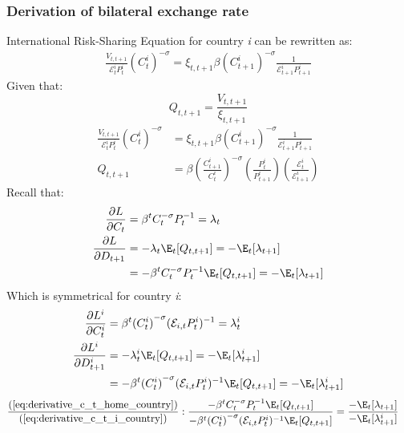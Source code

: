 \subsubsection{Derivation of bilateral exchange rate}
International Risk-Sharing Equation for country \textit{i} can be rewritten as:
\begin{align}
    \frac{V_{t,t+1}}{\mathcal{E}^i_tP^i_t}({C^{i}_{t}})^{-\sigma} = \xi_{t,t+1} \beta ({C^{i}_{t+1}})^{-\sigma} \frac{1}{\mathcal{E}^i_{t+1}P^{i}_{t+1}} \label{eq:appendix_bilateral_start}
\end{align}
Given that:
\begin{equation}
    Q_{t,t+1} = \frac{V_{t,t+1}}{\xi_{t,t+1}}
\end{equation}
\begin{align}
    \frac{V_{t,t+1}}{\mathcal{E}^i_tP^i_t}({C^{i}_{t}})^{-\sigma}         & = \xi_{t,t+1} \beta ({C^{i}_{t+1}})^{-\sigma} \frac{1}{\mathcal{E}^i_{t+1}P^{i}_{t+1}}                                                                    \\
    Q_{t,t+1}                                                             & = \beta \left(\frac{C^i_{t+1}}{C^i_{t}}\right)^{-\sigma} \left(\frac{P^i_t}{P^i_{t+1}}\right) \left(\frac{\mathcal{E}^i_{t}}{\mathcal{E}^i_{t+1}} \right) 
\end{align}
Recall that:
\begin{align}
    \frac{\partial L}{\partial C_t} &= \beta^t C_t^{-\sigma} P_{t}^{-1} = \lambda_t \\
    \frac{\partial L}{\partial D_{t+1}} & = -\lambda_t \E_t[Q_{t,t+1}] = -\E_t[\lambda_{t+1}] \\
    &=-\beta^t C_t^{-\sigma} P_{t}^{-1} \E_t[Q_{t,t+1}] = -\E_t[\lambda_{t+1}] \label{eq:derivative_c_t_home_country}
\end{align}
Which is symmetrical for country \textit{i}:
\begin{align}
    \frac{\partial L^i}{\partial C_t^i} &= \beta^t {(C^i_t)}^{-\sigma} (\mathcal{E}_{i,t}P^i_{t})^{-1} = \lambda^i_t \\
    \frac{\partial L^i}{\partial D_{t+1}^i} & = -\lambda^i_t \E_t[Q_{t,t+1}] = -\E_t[\lambda^i_{t+1}] \\
    &=-\beta^t {(C^i_t)}^{-\sigma} (\mathcal{E}_{i,t}P^i_{t})^{-1} \E_t[Q_{t,t+1}] = -\E_t[\lambda^i_{t+1}] \label{eq:derivative_c_t_i_country}
\end{align}
\begin{align}
    \frac{\text{(\ref{eq:derivative_c_t_home_country})}}{\text{(\ref{eq:derivative_c_t_i_country})}}: \frac{-\beta^t C_t^{-\sigma} P_{t}^{-1} \E_t[Q_{t,t+1}]}{-\beta^t {(C^i_t)}^{-\sigma} (\mathcal{E}_{i,t}P^i_{t})^{-1} \E_t[Q_{t,t+1}]} &= \frac{-\E_t[\lambda_{t+1}]}{-\E_t[\lambda^i_{t+1}]}
\end{align} 
